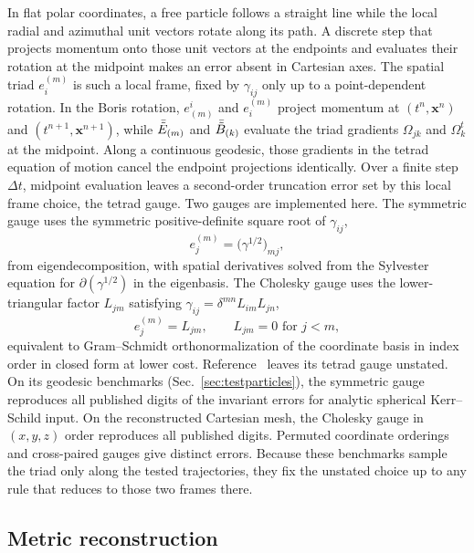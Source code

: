 In flat polar coordinates, a free particle follows a straight line while the local radial and azimuthal unit vectors rotate along its path. A discrete step that projects momentum onto those unit vectors at the endpoints and evaluates their rotation at the midpoint makes an error absent in Cartesian axes. The spatial triad $e^{(m)}_i$ is such a local frame, fixed by $\gamma_{ij}$ only up to a point-dependent rotation. In the Boris rotation, $e^i_{(m)}$ and $e^{(m)}_i$ project momentum at $(t^n, \bm{x}^n)$ and $(t^{n+1}, \bm{x}^{n+1})$, while $\bar{\tilde{E}}_{(m)}$ and $\bar{\tilde{B}}_{(k)}$ evaluate the triad gradients $\Omega_{jk}$ and $\Omega^t_k$ at the midpoint. Along a continuous geodesic, those gradients in the tetrad equation of motion cancel the endpoint projections identically. Over a finite step $\Delta t$, midpoint evaluation leaves a second-order truncation error set by this local frame choice, the tetrad gauge. Two gauges are implemented here. The symmetric gauge uses the symmetric positive-definite square root of $\gamma_{ij}$,
\begin{equation}\label{eq:symmetric_gauge}
e^{(m)}_j = \bigl(\gamma^{1/2}\bigr)_{mj},
\end{equation}
from eigendecomposition, with spatial derivatives solved from the Sylvester equation for $\partial(\gamma^{1/2})$ in the eigenbasis. The Cholesky gauge uses the lower-triangular factor $L_{jm}$ satisfying $\gamma_{ij} = \delta^{mn} L_{im} L_{jn}$,
\begin{equation}\label{eq:cholesky_gauge}
e^{(m)}_j = L_{jm}, \qquad L_{jm} = 0 \text{ for } j < m,
\end{equation}
equivalent to Gram--Schmidt orthonormalization of the coordinate basis in index order in closed form at lower cost. Reference~\cite{Wu:2026nrpic} leaves its tetrad gauge unstated. On its geodesic benchmarks (Sec.~\ref{sec:testparticles}), the symmetric gauge reproduces all published digits of the invariant errors for analytic spherical Kerr--Schild input. On the reconstructed Cartesian mesh, the Cholesky gauge in $(x,y,z)$ order reproduces all published digits. Permuted coordinate orderings and cross-paired gauges give distinct errors. Because these benchmarks sample the triad only along the tested trajectories, they fix the unstated choice up to any rule that reduces to those two frames there.

\subsection{Metric reconstruction}\label{sec:reconstruction}

